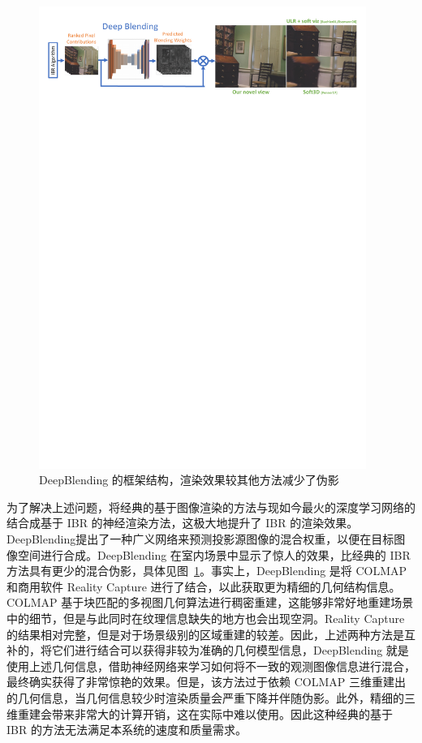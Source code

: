 \begin{figure}[tbhp]
    \centering
    \includegraphics[width=0.95\textwidth]{figures/deepblending.pdf}
    \caption{DeepBlending\cite{hedman2018deep} 的框架结构，渲染效果较其他方法减少了伪影}
    \label{fig:deepblending}
\end{figure}

为了解决上述问题，将经典的基于图像渲染的方法与现如今最火的深度学习网络的结合成基于 IBR 的神经渲染方法，这极大地提升了 IBR 的渲染效果。DeepBlending\cite{hedman2018deep}提出了一种广义网络来预测投影源图像的混合权重，以便在目标图像空间进行合成。DeepBlending 在室内场景中显示了惊人的效果，比经典的 IBR 方法具有更少的混合伪影，具体见图~\ref{fig:deepblending}。事实上，DeepBlending 是将 COLMAP\cite{schonberger2016structure} 和商用软件 Reality Capture 进行了结合，以此获取更为精细的几何结构信息。COLMAP 基于块匹配的多视图几何算法进行稠密重建，这能够非常好地重建场景中的细节，但是与此同时在纹理信息缺失的地方也会出现空洞。Reality Capture 的结果相对完整，但是对于场景级别的区域重建的较差。因此，上述两种方法是互补的，将它们进行结合可以获得非较为准确的几何模型信息，DeepBlending 就是使用上述几何信息，借助神经网络来学习如何将不一致的观测图像信息进行混合，最终确实获得了非常惊艳的效果。但是，该方法过于依赖 COLMAP 三维重建出的几何信息，当几何信息较少时渲染质量会严重下降并伴随伪影。此外，精细的三维重建会带来非常大的计算开销，这在实际中难以使用。因此这种经典的基于 IBR 的方法无法满足本系统的速度和质量需求。

